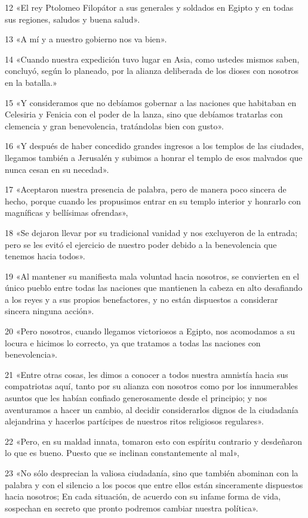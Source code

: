 \par 12 «El rey Ptolomeo Filopátor a sus generales y soldados en Egipto y en todas sus regiones, saludos y buena salud».
\par 13 «A mí y a nuestro gobierno nos va bien».
\par 14 «Cuando nuestra expedición tuvo lugar en Asia, como ustedes mismos saben, concluyó, según lo planeado, por la alianza deliberada de los dioses con nosotros en la batalla.»
\par 15 «Y consideramos que no debíamos gobernar a las naciones que habitaban en Celesiria y Fenicia con el poder de la lanza, sino que debíamos tratarlas con clemencia y gran benevolencia, tratándolas bien con gusto».
\par 16 «Y después de haber concedido grandes ingresos a los templos de las ciudades, llegamos también a Jerusalén y subimos a honrar el templo de esos malvados que nunca cesan en su necedad».
\par 17 «Aceptaron nuestra presencia de palabra, pero de manera poco sincera de hecho, porque cuando les propusimos entrar en su templo interior y honrarlo con magníficas y bellísimas ofrendas»,
\par 18 «Se dejaron llevar por su tradicional vanidad y nos excluyeron de la entrada; pero se les evitó el ejercicio de nuestro poder debido a la benevolencia que tenemos hacia todos».
\par 19 «Al mantener su manifiesta mala voluntad hacia nosotros, se convierten en el único pueblo entre todas las naciones que mantienen la cabeza en alto desafiando a los reyes y a sus propios benefactores, y no están dispuestos a considerar sincera ninguna acción».
\par 20 «Pero nosotros, cuando llegamos victoriosos a Egipto, nos acomodamos a su locura e hicimos lo correcto, ya que tratamos a todas las naciones con benevolencia».
\par 21 «Entre otras cosas, les dimos a conocer a todos nuestra amnistía hacia sus compatriotas aquí, tanto por su alianza con nosotros como por los innumerables asuntos que les habían confiado generosamente desde el principio; y nos aventuramos a hacer un cambio, al decidir considerarlos dignos de la ciudadanía alejandrina y hacerlos partícipes de nuestros ritos religiosos regulares».
\par 22 «Pero, en su maldad innata, tomaron esto con espíritu contrario y desdeñaron lo que es bueno. Puesto que se inclinan constantemente al mal»,
\par 23 «No sólo desprecian la valiosa ciudadanía, sino que también abominan con la palabra y con el silencio a los pocos que entre ellos están sinceramente dispuestos hacia nosotros; En cada situación, de acuerdo con su infame forma de vida, sospechan en secreto que pronto podremos cambiar nuestra política».
